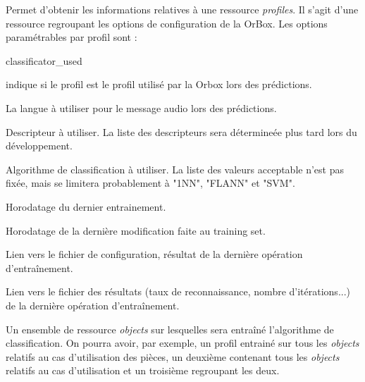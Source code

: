 \begin{appendices}
\begin{absolutelynopagebreak}
Permet d'obtenir les informations relatives à une ressource \emph{profiles}.
Il s'agit d'une ressource regroupant les options de configuration de la OrBox.
Les options paramétrables par profil sont :
\begin{labeling}[~--]{classificator\_used}
    \item[active] indique si le profil est le profil utilisé par la Orbox lors des prédictions.
    \item[audio\_langage] La langue à utiliser pour le message audio lors des prédictions.
    \item[descriptor\_used] Descripteur à utiliser. 
    La liste des descripteurs sera détermineée plus tard lors du développement.
    \item[classificator\_used] Algorithme de classification à utiliser.
    La liste des valeurs acceptable n'est pas fixée, mais se limitera probablement à "1NN", "FLANN" et "SVM".
    \item[last\_trained] Horodatage du dernier entrainement.
    \item[last\_updated] Horodatage de la dernière modification faite au training set.
    \item[config\_file] Lien vers le fichier de configuration, résultat de la dernière opération d'entraînement.
    \item[result\_file] Lien vers le fichier des résultats (taux de reconnaissance, nombre d'itérations...) de la dernière opération d'entraînement.
    \item [training\_set] Un ensemble de ressource \emph{objects} sur lesquelles sera entraîné l'algorithme de classification.
    On pourra avoir, par exemple, un profil entrainé sur tous les \emph{objects} relatifs au cas d'utilisation des pièces, un deuxième contenant tous les \emph{objects} relatifs au cas d'utilisation et un troisième regroupant les deux.
\end{labeling}


\end{absolutelynopagebreak}
\end{appendices}
